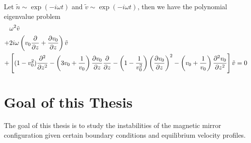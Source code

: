 Let $\tilde{n}\sim \exp(-i\omega t)$ and $\tilde{v} \sim \exp(-i\omega t)$, then we have the polynomial eigenvalue problem
\begin{equation}
  \begin{aligned}
    &\omega^2 \tilde{v} \\
    +& 2i\omega\left(v_0\pdv{}{z} + \pdv{v_0}{z}\right) \tilde{v} \\
    +& \left[ (1-v_0^2)\pdv[2]{}{z} 
      -\left(3v_0 + \frac{1}{v_0}\right)\pdv{v_0}{z}\pdv{}{z} 
      -\left(1-\frac{1}{v_0^2}\right)\left(\pdv{v_0}{z}\right)^2 
    - \left(v_0+\frac{1}{v_0}\right)\pdv[2]{v_0}{z} \right]\tilde{v}
    = 0
  \end{aligned}
  \label{eq:polynomial-eigenvalue-problem}
\end{equation}





\section{Goal of this Thesis}
The goal of this thesis is to study the instabilities of the magnetic mirror configuration given certain boundary conditions and equilibrium velocity profiles.

